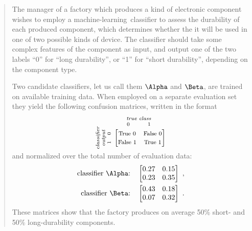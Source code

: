 \documentclass[\ifafour a4paper,12pt,\else a5paper,10pt,\fi%
onecolumn,oneside,article,%
british%
]{memoir}
\theoremstyle{remark}
\theoremstyle{innote}
\renewcommand*{\|}[1][]{\nonscript\:#1\vert\nonscript\:\mathopen{}}
\newcommand*{\ml}{machine-learning}
\begin{document}
\begin{quotation}
  \small The manager of a factory which produces a kind of electronic component wishes to employ a \ml\ classifier to assess the durability of each produced component, which determines whether the it will be used in one of two possible kinds of device. The classifier should take some complex features of the component as input, and output one of the two labels \enquote{0} for \enquote{long durability}, or \enquote{1} for \enquote{short durability}, depending on the component type.

Two candidate classifiers, let us call them $\Alpha$ and $\Beta$, are trained on available training data. When employed on a separate evaluation set they yield the following confusion matrices, written in the format
\begin{equation*}
  \rotatebox[origin=c]{90}{
    \clap{\textit{\parbox{5em}{\centering\scriptsize classifier\\output\\$1\quad 0$}}
    }}\ 
    \overbracket[0pt]{
      \begin{bmatrix}
    \text{\footnotesize True 0} & \text{\footnotesize False 0}\\
    \text{\footnotesize False 1} & \text{\footnotesize True 1}\\
      \end{bmatrix}}^{
      \clap{\textit{\parbox{6em}{\centering\scriptsize true class\\$0\hspace{3em}1$}}
    }}
\end{equation*}
and normalized over the total number of evaluation data:
\begin{align}
  \label{eq:CM_A}
\text{classifier $\Alpha$:}\quad  \begin{bmatrix}
    0.27 & 0.15 \\ 0.23 & 0.35
  \end{bmatrix}
\ ,
  \\
  \label{eq:CM_B}
\text{classifier $\Beta$:}\quad  \begin{bmatrix}
    0.43 & 0.18 \\ 0.07 & 0.32
  \end{bmatrix}
\ .
\end{align}
These matrices show that the factory produces on average 50\% short- and 50\% long-durability components.


\end{quotation}
\end{document}
